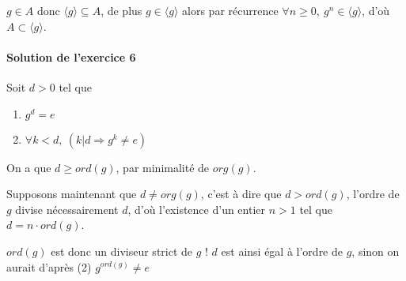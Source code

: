 \documentclass[]{article}
\theoremstyle{remark}
\theoremstyle{definition}
\begin{document}
$g \in A$ donc $\langle g \rangle \subseteq A$, de plus $g \in \langle g \rangle$ alors par récurrence $\forall n \geqslant 0, ~ g^n \in \langle g \rangle$, d'où $A \subset \langle g \rangle$.

\paragraph{Solution de l'exercice 6}

Soit $d > 0$ tel que
\begin{enumerate}
	\item $g^d=e$
	\item $\forall k < d, ~ (k | d \Longrightarrow g^k \neq e)$
\end{enumerate}

On a que $d \geqslant ord(g)$, par minimalité de $org(g)$.

Supposons maintenant que $d \neq org(g)$, c'est à dire que $d > ord(g)$, l'ordre de $g$ divise nécessairement $d$, d'où l'existence d'un entier $n > 1$ tel que $d= n \cdot ord(g)$.

$ord(g)$ est donc un diviseur strict de $g$ ! $d$ est ainsi égal à l'ordre de $g$, sinon on aurait d'après (2) $g^{ord(g)} \neq e$
\end{document}
